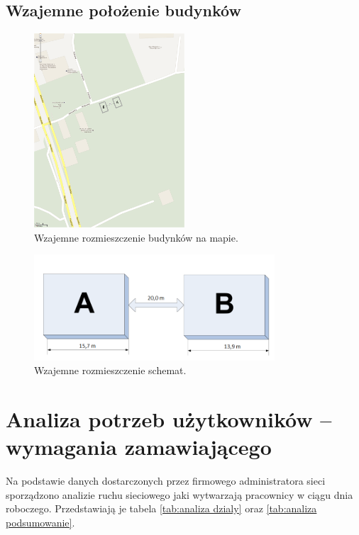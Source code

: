 \documentclass{report}
\begin{document}
\section{Wzajemne położenie budynków}
\begin{figure}[H]
  \centering
      \includegraphics[width=0.5\textwidth]{./obrazki/rzut_terenowy.png}
    \caption{Wzajemne rozmieszczenie budynków na mapie.}
\end{figure}

\begin{figure}[H]
  \centering
      \includegraphics[width=0.8\textwidth]{./obrazki/rozmieszczenie_budynkow.jpeg}
    \caption{Wzajemne rozmieszczenie schemat.}
\end{figure}



\chapter{Analiza potrzeb użytkowników – wymagania zamawiającego}
Na podstawie danych dostarczonych przez firmowego administratora sieci sporządzono analizie ruchu sieciowego jaki wytwarzają
pracownicy w ciągu dnia roboczego. Przedstawiają je tabela 
\ref{tab:analiza dzialy} oraz \ref{tab:analiza podsumowanie}.
\end{document}

